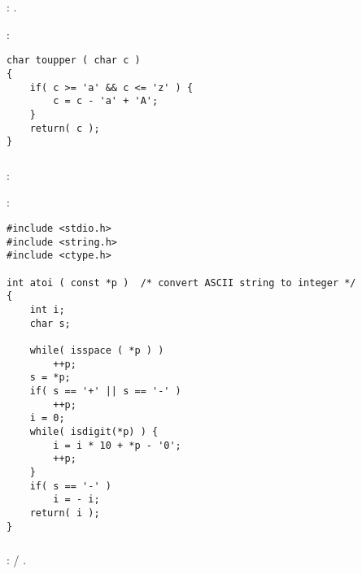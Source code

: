 \chapter{}

\section{}

\subsection{}

: .

:

\begin{lstlisting}
char toupper ( char c )
{
    if( c >= 'a' && c <= 'z' ) {
        c = c - 'a' + 'A';
    }
    return( c );
}
\end{lstlisting}

\subsection{}

: 

:

\begin{lstlisting}
#include <stdio.h>
#include <string.h>
#include <ctype.h>

int atoi ( const *p )  /* convert ASCII string to integer */
{
    int i;
    char s;

    while( isspace ( *p ) )
        ++p;
    s = *p;
    if( s == '+' || s == '-' )
        ++p;
    i = 0;
    while( isdigit(*p) ) {
        i = i * 10 + *p - '0';
        ++p;
    }
    if( s == '-' )
        i = - i;
    return( i );
}
\end{lstlisting}

\subsection{}

:  / .

